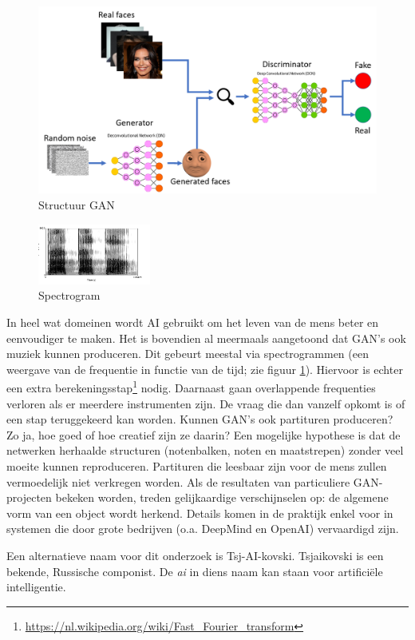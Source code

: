 \documentclass[dutch, twoside, a4paper, 10pt]{article}
\begin{document}
\begin{figure}[h!]
    \centering
    \includegraphics[scale=0.25]{GAN_en.png}
    \caption{Structuur GAN}
\end{figure}

\begin{figure}
    \vspace{-\baselineskip}
    \centering
    \includegraphics[width=0.33\textwidth, trim={2 0 0 0}, clip]{Praat-spectrogram-tatata.png}
    \caption{Spectrogram}
    \label{fig:Spectrogram}
    
    \vspace{-3\baselineskip}
\end{figure}
\noindent
In heel wat domeinen wordt AI gebruikt om het leven van de mens beter en eenvoudiger te maken. Het is bovendien al meermaals aangetoond dat GAN's ook muziek kunnen produceren. Dit gebeurt meestal via spectrogrammen (een weergave van de frequentie in functie van de tijd; zie figuur \ref{fig:Spectrogram}). Hiervoor is echter een extra berekeningsstap\footnote{\url{https://nl.wikipedia.org/wiki/Fast_Fourier_transform}} nodig. Daarnaast gaan overlappende frequenties verloren als er meerdere instrumenten zijn. De vraag die dan vanzelf opkomt is of een stap teruggekeerd kan worden. Kunnen GAN's ook partituren produceren? Zo ja, hoe goed of hoe creatief zijn ze daarin? Een mogelijke hypothese is dat de netwerken herhaalde structuren (notenbalken, noten en maatstrepen) zonder veel moeite kunnen reproduceren. Partituren die leesbaar zijn voor de mens zullen vermoedelijk niet verkregen worden. Als de resultaten van particuliere GAN-projecten bekeken worden, treden gelijkaardige verschijnselen op: de algemene vorm van een object wordt herkend. Details komen in de praktijk enkel voor in systemen die door grote bedrijven (o.a. DeepMind en OpenAI) vervaardigd zijn. 
\par\bigskip\noindent
Een alternatieve naam voor dit onderzoek is Tsj-AI-kovski. Tsjaikovski is een bekende, Russische componist. De \textit{ai} in diens naam kan staan voor artificiële intelligentie.
\end{document}
